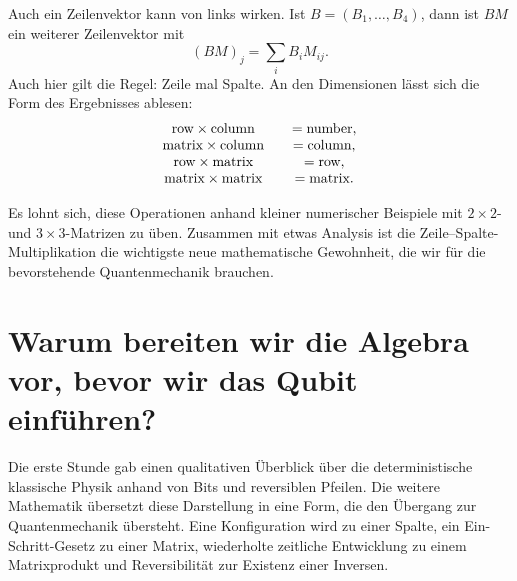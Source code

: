 Auch ein Zeilenvektor kann von links wirken. Ist \(B=(B_1,\ldots,B_4)\), dann ist \(BM\) ein weiterer Zeilenvektor mit
\begin{equation}
  (BM)_j=\sum_i B_iM_{ij}.
  \label{eq:l01-row-times-matrix}
\end{equation}
Auch hier gilt die Regel: Zeile mal Spalte. An den Dimensionen lässt sich die Form des Ergebnisses ablesen:
\begin{equation}
\begin{array}{c@{\qquad}c}
\text{row}\times\text{column}&=\text{number},\\
\text{matrix}\times\text{column}&=\text{column},\\
\text{row}\times\text{matrix}&=\text{row},\\
\text{matrix}\times\text{matrix}&=\text{matrix}.
\end{array}
\label{eq:l01-shape-rules}
\end{equation}

Es lohnt sich, diese Operationen anhand kleiner numerischer Beispiele mit \(2\times2\)- und \(3\times3\)-Matrizen zu üben. Zusammen mit etwas Analysis ist die Zeile--Spalte-Multiplikation die wichtigste neue mathematische Gewohnheit, die wir für die bevorstehende Quantenmechanik brauchen.

\begin{classroomqa}
\end{classroomqa}

\section{Warum bereiten wir die Algebra vor, bevor wir das Qubit einführen?}

Die erste Stunde gab einen qualitativen Überblick über die deterministische klassische Physik anhand von Bits und reversiblen Pfeilen. Die weitere Mathematik übersetzt diese Darstellung in eine Form, die den Übergang zur Quantenmechanik übersteht. Eine Konfiguration wird zu einer Spalte, ein Ein-Schritt-Gesetz zu einer Matrix, wiederholte zeitliche Entwicklung zu einem Matrixprodukt und Reversibilität zur Existenz einer Inversen.

